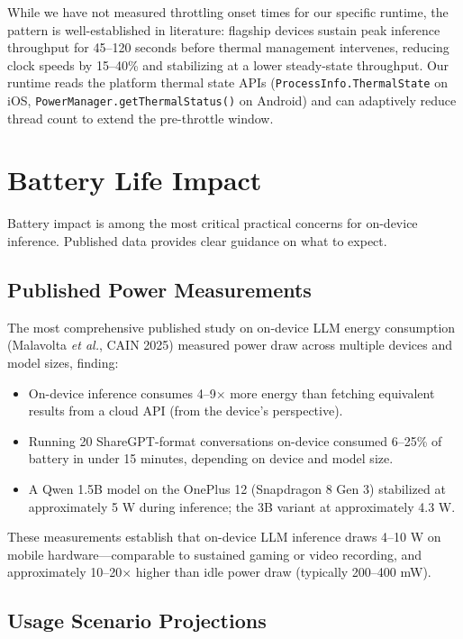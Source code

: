 \documentclass[12pt, letterpaper, twoside]{report}
\newcommand{\etal}{\textit{et al.}\xspace}
\begin{document}
While we have not measured throttling onset times for our specific runtime, the pattern is well-established in literature: flagship devices sustain peak inference throughput for 45--120 seconds before thermal management intervenes, reducing clock speeds by 15--40\% and stabilizing at a lower steady-state throughput. Our runtime reads the platform thermal state APIs (\texttt{ProcessInfo.ThermalState} on iOS, \texttt{PowerManager.getThermalStatus()} on Android) and can adaptively reduce thread count to extend the pre-throttle window.

\section{Battery Life Impact}
\label{sec:battery}

Battery impact is among the most critical practical concerns for on-device inference. Published data provides clear guidance on what to expect.

\subsection{Published Power Measurements}
\label{subsec:published_power}

The most comprehensive published study on on-device LLM energy consumption (Malavolta \etal, CAIN 2025) measured power draw across multiple devices and model sizes, finding:

\begin{itemize}[itemsep=1pt, topsep=2pt, parsep=0pt]
\item On-device inference consumes 4--9$\times$ more energy than fetching equivalent results from a cloud API (from the device's perspective).
\item Running 20 ShareGPT-format conversations on-device consumed 6--25\% of battery in under 15 minutes, depending on device and model size.
\item A Qwen 1.5B model on the OnePlus 12 (Snapdragon 8 Gen 3) stabilized at approximately 5 W during inference; the 3B variant at approximately 4.3 W.
\end{itemize}

These measurements establish that on-device LLM inference draws 4--10 W on mobile hardware---comparable to sustained gaming or video recording, and approximately 10--20$\times$ higher than idle power draw (typically 200--400 mW).

\subsection{Usage Scenario Projections}
\label{subsec:usage_projections}
\end{document}
